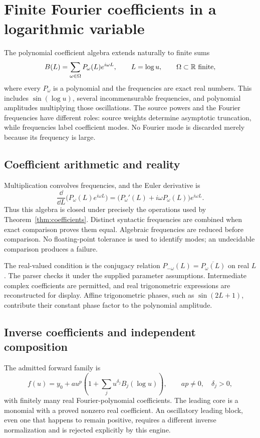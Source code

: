 \section{Finite Fourier coefficients in a logarithmic variable}
\label{sec:fourier-coefficients}

The polynomial coefficient algebra extends naturally to finite sums
\[
 B(L)=\sum_{\omega\in\Omega}P_\omega(L)e^{i\omega L},
 \qquad L=\log u,\qquad \Omega\subset\mathbb R\text{ finite},
\]
where every $P_\omega$ is a polynomial and the frequencies are exact real
numbers. This includes $\sin(\log u)$, several incommensurable frequencies,
and polynomial amplitudes multiplying those oscillations. The source powers
and the Fourier frequencies have different roles: source weights determine
asymptotic truncation, while frequencies label coefficient modes. No Fourier
mode is discarded merely because its frequency is large.

\subsection{Coefficient arithmetic and reality}

Multiplication convolves frequencies, and the Euler derivative is
\[
 \frac{\dd}{\dd L}\bigl(P_\omega(L)e^{i\omega L}\bigr)
 =\bigl(P_\omega'(L)+i\omega P_\omega(L)\bigr)e^{i\omega L}.
\]
Thus this algebra is closed under precisely the operations used by
Theorem~\ref{thm:coefficients}. Distinct syntactic frequencies are combined
when exact comparison proves them equal. Algebraic frequencies are reduced
before comparison. No floating-point tolerance is used to identify modes;
an undecidable comparison produces a failure.

The real-valued condition is the conjugacy relation
$P_{-\omega}(L)=\overline{P_\omega(L)}$ on real $L$. The parser checks it
under the supplied parameter assumptions. Intermediate complex coefficients
are permitted, and real trigonometric expressions are reconstructed for
display. Affine trigonometric phases, such as $\sin(2L+1)$, contribute their
constant phase factor to the polynomial amplitude.

\subsection{Inverse coefficients and independent composition}

The admitted forward family is
\[
 f(u)=y_0+a u^p\left(1+\sum_j u^{\delta_j}B_j(\log u)\right),
 \qquad ap\ne0,\quad \delta_j>0,
\]
with finitely many real Fourier-polynomial coefficients. The leading core is
a monomial with a proved nonzero real coefficient. An oscillatory leading
block, even one that happens to remain positive, requires a different inverse
normalization and is rejected explicitly by this engine.

